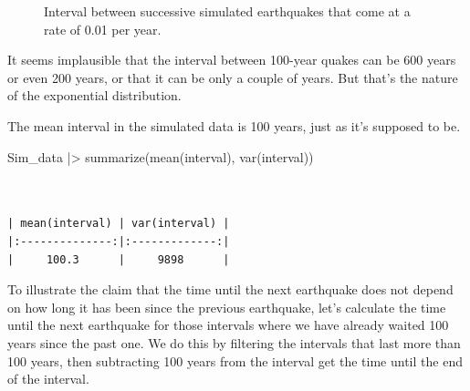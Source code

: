 \documentclass[
  letterpaper,
  DIV=11,
  numbers=noendperiod,
  oneside]{scrartcl}
\newenvironment{Shaded}{\begin{snugshade}}{\end{snugshade}}
\newcommand{\FunctionTok}[1]{\textcolor[rgb]{0.28,0.35,0.67}{#1}}
\newcommand{\NormalTok}[1]{\textcolor[rgb]{0.00,0.23,0.31}{#1}}
\newcommand{\SpecialCharTok}[1]{\textcolor[rgb]{0.37,0.37,0.37}{#1}}
\begin{document}
\begin{figure}[H]


\caption{\label{fig-quake-intervals1}Interval between successive
simulated earthquakes that come at a rate of 0.01 per year.}

\end{figure}%

It seems implausible that the interval between 100-year quakes can be
600 years or even 200 years, or that it can be only a couple of years.
But that's the nature of the exponential distribution.

The mean interval in the simulated data is 100 years, just as it's
supposed to be.

\begin{Shaded}
\begin{Highlighting}[]
\NormalTok{Sim\_data }\SpecialCharTok{|\textgreater{}} \FunctionTok{summarize}\NormalTok{(}\FunctionTok{mean}\NormalTok{(interval), }\FunctionTok{var}\NormalTok{(interval))}
\end{Highlighting}
\end{Shaded}

\begin{verbatim}


| mean(interval) | var(interval) |
|:--------------:|:-------------:|
|     100.3      |     9898      |
\end{verbatim}

To illustrate the claim that the time until the next earthquake does not
depend on how long it has been since the previous earthquake, let's
calculate the time until the next earthquake for those intervals where
we have already waited 100 years since the past one. We do this by
filtering the intervals that last more than 100 years, then subtracting
100 years from the interval get the time until the end of the interval.
\end{document}
